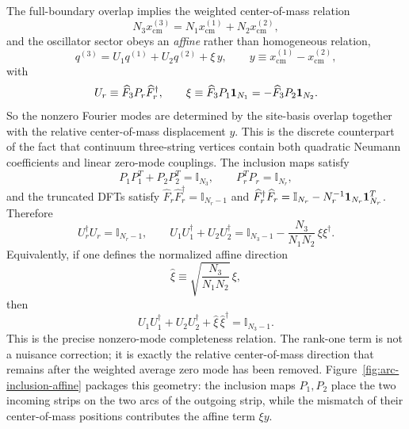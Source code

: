 \documentclass[11pt]{article}
\numberwithin{equation}{section}
\begin{document}
The full-boundary overlap implies the weighted center-of-mass relation
\begin{equation}
\label{eq:s10-009}
N_3 x_{\mathrm{cm}}^{(3)} = N_1 x_{\mathrm{cm}}^{(1)} + N_2 x_{\mathrm{cm}}^{(2)},
\end{equation}
and the oscillator sector obeys an \emph{affine} rather than homogeneous relation,
\begin{equation}
\label{eq:s10-010}
q^{(3)} = U_1 q^{(1)} + U_2 q^{(2)} + \xi\,y,
\qquad
y\equiv x_{\mathrm{cm}}^{(1)}-x_{\mathrm{cm}}^{(2)},
\end{equation}
with
\begin{equation}
\label{eq:s10-011}
U_r \equiv \widehat F_3 P_r \widehat F_r^\dagger,
\qquad
\xi \equiv \widehat F_3 P_1 {\bf 1}_{N_1}
= -\widehat F_3 P_2 {\bf 1}_{N_2}.
\end{equation}
So the nonzero Fourier modes are determined by the site-basis overlap together with the relative center-of-mass displacement $y$. This is the discrete counterpart of the fact that continuum three-string vertices contain both quadratic Neumann coefficients and linear zero-mode couplings.
The inclusion maps satisfy
\[
P_1P_1^T+P_2P_2^T=\mathbb I_{N_3},
\qquad
P_r^T P_r = \mathbb I_{N_r},
\]
and the truncated DFTs satisfy $\widehat F_r\widehat F_r^\dagger=\mathbb I_{N_r-1}$ and $\widehat F_r^\dagger\widehat F_r=\mathbb I_{N_r}-N_r^{-1}{\bf 1}_{N_r}{\bf 1}_{N_r}^T$. Therefore
\begin{equation}
\label{eq:s10-012}
U_r^\dagger U_r = \mathbb I_{N_r-1},
\qquad
U_1U_1^\dagger + U_2U_2^\dagger
=
\mathbb I_{N_3-1}-\frac{N_3}{N_1N_2}\,\xi\xi^\dagger.
\end{equation}
Equivalently, if one defines the normalized affine direction
\begin{equation}
\label{eq:s10-013}
\widehat\xi\equiv \sqrt{\frac{N_3}{N_1N_2}}\,\xi,
\end{equation}
then
\begin{equation}
\label{eq:s10-014}
U_1U_1^\dagger + U_2U_2^\dagger + \widehat\xi\,\widehat\xi^\dagger = \mathbb I_{N_3-1}.
\end{equation}
This is the precise nonzero-mode completeness relation. The rank-one term is not a nuisance correction; it is exactly the relative center-of-mass direction that remains after the weighted average zero mode has been removed.
Figure~\ref{fig:arc-inclusion-affine} packages this geometry: the inclusion maps $P_1,P_2$ place the two incoming strips on the two arcs of the outgoing strip, while the mismatch of their center-of-mass positions contributes the affine term $\xi y$.
\end{document}
